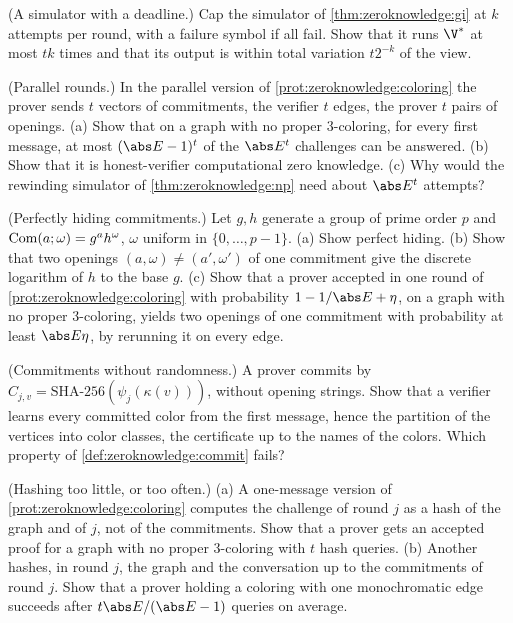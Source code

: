 \begin{refsection}
\begin{exercises}
\item \consolidation (A simulator with a deadline.) Cap the simulator of \cref{thm:zeroknowledge:gi} at $k$ attempts per round, with a failure symbol if all fail. Show that it runs $\V^*$ at most $tk$ times and that its output is within total variation $t2^{-k}$ of the view.\label{ex:zeroknowledge:cap}

\item \variation (Parallel rounds.) In the parallel version of \cref{prot:zeroknowledge:coloring} the prover sends $t$ vectors of commitments, the verifier $t$ edges, the prover $t$ pairs of openings. (a) Show that on a graph with no proper 3-coloring, for every first message, at most $(\abs E-1)^t$ of the $\abs E^t$ challenges can be answered. (b) Show that it is honest-verifier computational zero knowledge. (c) Why would the rewinding simulator of \cref{thm:zeroknowledge:np} need about $\abs E^t$ attempts?\label{ex:zeroknowledge:parallel}

\item \variation\hard (Perfectly hiding commitments.) Let $g,h$ generate a group of prime order $p$ and $\mathrm{Com}(a;\omega)=g^ah^\omega$, $\omega$ uniform in $\{0,\dots,p-1\}$. (a) Show perfect hiding. (b) Show that two openings $(a,\omega)\ne(a',\omega')$ of one commitment give the discrete logarithm of $h$ to the base $g$. (c) Show that a prover accepted in one round of \cref{prot:zeroknowledge:coloring} with probability $1-1/\abs E+\eta$, on a graph with no proper 3-coloring, yields two openings of one commitment with probability at least $\abs E\eta$, by rerunning it on every edge. \label{ex:zeroknowledge:pedersen}

\item \attack (Commitments without randomness.) A prover commits by $C_{j,v}=\text{SHA-256}(\psi_j(\kappa(v)))$, without opening strings. Show that a verifier learns every committed color from the first message, hence the partition of the vertices into color classes, the certificate up to the names of the colors. Which property of \cref{def:zeroknowledge:commit} fails?\label{ex:zeroknowledge:deterministic}

\item \attack (Hashing too little, or too often.) (a) A one-message version of \cref{prot:zeroknowledge:coloring} computes the challenge of round $j$ as a hash of the graph and of $j$, not of the commitments. Show that a prover gets an accepted proof for a graph with no proper 3-coloring with $t$ hash queries. (b) Another hashes, in round $j$, the graph and the conversation up to the commitments of round $j$. Show that a prover holding a coloring with one monochromatic edge succeeds after $t\abs E/(\abs E-1)$ queries on average.\label{ex:zeroknowledge:weakfs}


\end{exercises}
\end{refsection}
